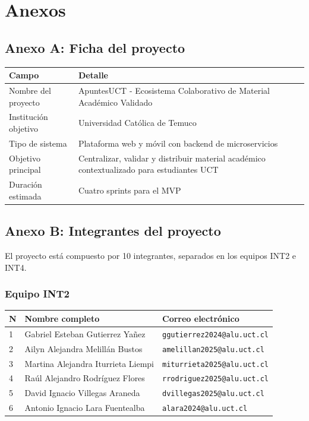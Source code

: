\documentclass[12pt,a4paper]{article}
\renewcommand{\arraystretch}{1.15}
\newcommand{\correo}[1]{\nolinkurl{#1}}
\begin{document}
\section{Anexos}

\subsection*{Anexo A: Ficha del proyecto}

\begin{longtable}{p{} p{}}
\toprule
\textbf{Campo} & \textbf{Detalle}\\
\midrule
Nombre del proyecto & ApuntesUCT - Ecosistema Colaborativo de Material Académico Validado\\
Institución objetivo & Universidad Católica de Temuco\\
Tipo de sistema & Plataforma web y móvil con backend de microservicios\\
Objetivo principal & Centralizar, validar y distribuir material académico contextualizado para estudiantes UCT\\
Duración estimada & Cuatro sprints para el MVP\\
\bottomrule
\end{longtable}

\subsection*{Anexo B: Integrantes del proyecto}

El proyecto está compuesto por 10 integrantes, separados en los equipos INT2 e INT4.

\subsubsection*{Equipo INT2}

{\small
\renewcommand{\arraystretch}{1.2}
\begin{longtable}{@{}L{0.06\textwidth}L{0.46\textwidth}L{0.40\textwidth}@{}}
\toprule
\textbf{N} & \textbf{Nombre completo} & \textbf{Correo electrónico}\\
 & Gabriel Esteban Gutierrez Yañez & \correo{ggutierrez2024@alu.uct.cl}\\
2 & Ailyn Alejandra Melillán Bustos & \correo{amelillan2025@alu.uct.cl}\\
3 & Martina Alejandra Iturrieta Liempi & \correo{miturrieta2025@alu.uct.cl}\\
4 & Raúl Alejandro Rodríguez Flores & \correo{rrodriguez2025@alu.uct.cl}\\
5 & David Ignacio Villegas Araneda & \correo{dvillegas2025@alu.uct.cl}\\
6 & Antonio Ignacio Lara Fuentealba & \correo{alara2024@alu.uct.cl}\\
\bottomrule
\end{longtable}
}
\end{document}
